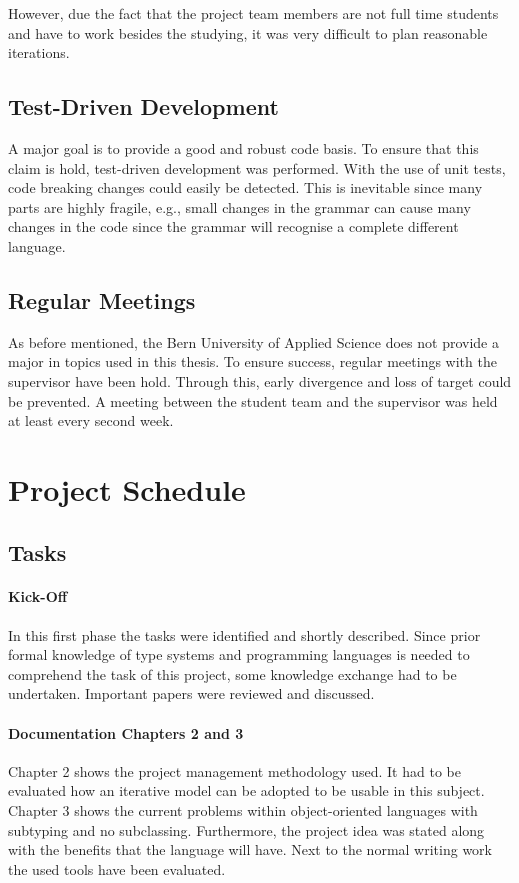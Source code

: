 However, due the fact that the project team members are not full time
students and have to work besides the studying, it was very difficult
to plan reasonable iterations.

\subsection{Test-Driven Development}
A major goal is to provide a good and robust code basis. To ensure that
this claim is hold, test-driven development was performed. With the use of
unit tests, code breaking changes could easily be detected. This is inevitable
since many parts are highly fragile, e.g., small changes in the grammar can
cause many changes in the code since the grammar will recognise a complete
different language.

\subsection{Regular Meetings}
As before mentioned, the Bern University of Applied Science does not provide a major in
topics used in this thesis. To ensure success, regular meetings with the
supervisor have been hold. Through this, early divergence and loss of target could
be prevented. A meeting between the student team and the supervisor
was held at least every second week.

\section{Project Schedule}
\subsection{Tasks}
\paragraph{Kick-Off}
In this first phase the tasks were identified and shortly
described. Since prior formal knowledge of type systems and programming
languages is needed to comprehend the task of this project, some
knowledge exchange had to be undertaken. Important papers were reviewed
and discussed.

\paragraph{Documentation Chapters 2 and 3}
Chapter 2 shows the project management methodology used. It had to be
evaluated how an iterative model can be adopted to be usable in this
subject. Chapter 3 shows the current problems within object-oriented
languages with subtyping and no subclassing. Furthermore, the project idea
was stated along with the benefits that the language will have. Next
to the normal writing work the used tools have been evaluated.

